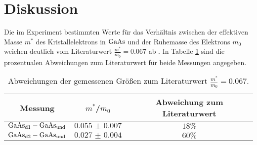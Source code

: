 \section{Diskussion}
\label{sec:Diskussion}
Die im Experiment bestimmten Werte für das Verhältnis zwischen der effektiven Masse $m^{*}$ des Kristallelektrons in $\ce{GaAs}$ und der Ruhemasse des Elektrons $m_{0}$ weichen deutlich vom Literaturwert
$\frac{m^{*}}{m_{0}}=\num{0.067}$ ab \cite{eff_mass}. In Tabelle \ref{tab:diskussion} sind die prozentualen Abweichungen zum Literaturwert für beide Messungen angegeben.
\begin{table}
  \centering
  \caption{Abweichungen der gemessenen Größen zum Literaturwert $\frac{m^{*}}{m_{0}}=\num{0.067}$.}
  \label{tab:diskussion}
  \begin{tabular}{ccc}
    \toprule
    Messung&$m^{*}$/$m_{0}$&Abweichung zum Literaturwert\\
    \midrule
    $\ce{GaAs}_{\mathrm{d1}}-\ce{GaAs}_{\mathrm{und}}$&$\num{0.055(7)}$&$18\%$\\
    $\ce{GaAs}_{\mathrm{d2}}-\ce{GaAs}_{\mathrm{und}}$&$\num{0.027(4)}$&$60\%$\\
    \bottomrule
  \end{tabular}
\end{table}

